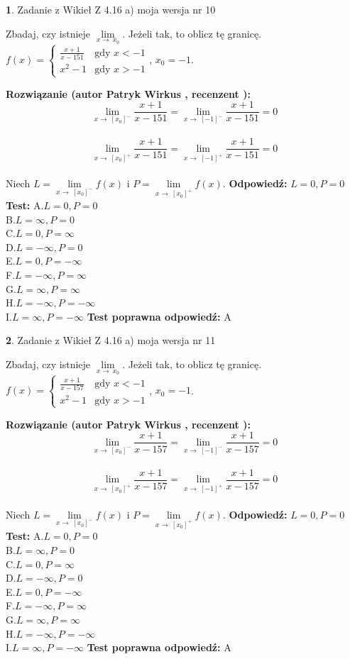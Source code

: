 \documentclass[12pt, a4paper]{article}
\theoremstyle{definition} %
\newtheorem{zad}{}
\newcommand{\zadStart}[1]{\begin{zad}#1\newline}
\newcommand{\zadStop}{\end{zad}}
\newcommand{\rozwStart}[2]{\noindent \textbf{Rozwiązanie (autor #1 , recenzent #2): }\newline}
\newcommand{\rozwStop}{\newline}
\newcommand{\odpStart}{\noindent \textbf{Odpowiedź:}\newline}
\newcommand{\odpStop}{\newline}
\newcommand{\testStart}{\noindent \textbf{Test:}\newline}
\newcommand{\testStop}{\newline}
\newcommand{\kluczStart}{\noindent \textbf{Test poprawna odpowiedź:}\newline}
\newcommand{\kluczStop}{\newline}
\begin{document}
\zadStart{Zadanie z Wikieł Z 4.16 a) moja wersja nr 10}

Zbadaj, czy istnieje $\lim\limits_{x\to\ x_{0}}$. Jeżeli tak, to oblicz tę granicę.\\   $f(x) = \left\{ \begin{array}{ll}
\frac{x+1}{x-151} & \textrm{gdy $x<-1$}\\
x^{2}-1 & \textrm{gdy $x>-1$}
\end{array} \right.$, $x_{0}=-1$.
\zadStop
\rozwStart{Patryk Wirkus}{}
$$\lim\limits_{x\to\ [x_{0}]^{-}}\frac{x+1}{x-151} = \lim\limits_{x\to\ [-1]^{-}}\frac{x+1}{x-151} = 0$$
\\
$$\lim\limits_{x\to\ [x_{0}]^{+}}\frac{x+1}{x-151} = \lim\limits_{x\to\ [-1]^{+}}\frac{x+1}{x-151} = 0$$
\\
Niech $L=\lim\limits_{x\to\ [x_{0}]^{-}}f(x)$ i $P=\lim\limits_{x\to\ [x_{0}]^{+}}f(x)$.
\rozwStop
\odpStart
$L=0, P=0$
\odpStop
\testStart
A.$L=0, P=0$\\ B.$L=\infty, P=0$\\ C.$L=0, P=\infty$\\ D.$L=-\infty, P=0$\\ E.$L=0, P=-\infty$\\
F.$L=-\infty, P=\infty$\\ G.$L=\infty, P=\infty$\\
H.$L=-\infty, P=-\infty$\\
I.$L=\infty, P=-\infty$
\testStop
\kluczStart
A
\kluczStop



\zadStart{Zadanie z Wikieł Z 4.16 a) moja wersja nr 11}

Zbadaj, czy istnieje $\lim\limits_{x\to\ x_{0}}$. Jeżeli tak, to oblicz tę granicę.\\   $f(x) = \left\{ \begin{array}{ll}
\frac{x+1}{x-157} & \textrm{gdy $x<-1$}\\
x^{2}-1 & \textrm{gdy $x>-1$}
\end{array} \right.$, $x_{0}=-1$.
\zadStop
\rozwStart{Patryk Wirkus}{}
$$\lim\limits_{x\to\ [x_{0}]^{-}}\frac{x+1}{x-157} = \lim\limits_{x\to\ [-1]^{-}}\frac{x+1}{x-157} = 0$$
\\
$$\lim\limits_{x\to\ [x_{0}]^{+}}\frac{x+1}{x-157} = \lim\limits_{x\to\ [-1]^{+}}\frac{x+1}{x-157} = 0$$
\\
Niech $L=\lim\limits_{x\to\ [x_{0}]^{-}}f(x)$ i $P=\lim\limits_{x\to\ [x_{0}]^{+}}f(x)$.
\rozwStop
\odpStart
$L=0, P=0$
\odpStop
\testStart
A.$L=0, P=0$\\ B.$L=\infty, P=0$\\ C.$L=0, P=\infty$\\ D.$L=-\infty, P=0$\\ E.$L=0, P=-\infty$\\
F.$L=-\infty, P=\infty$\\ G.$L=\infty, P=\infty$\\
H.$L=-\infty, P=-\infty$\\
I.$L=\infty, P=-\infty$
\testStop
\kluczStart
A
\kluczStop
\end{document}
